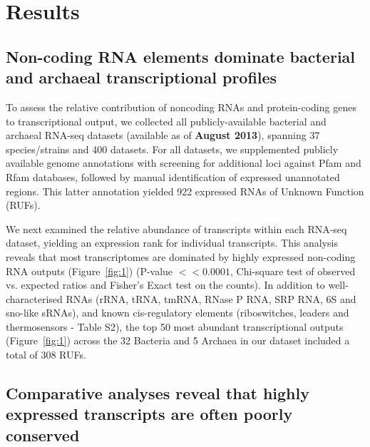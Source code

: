 \documentclass[10pt]{article}
\begin{document}
\section*{Results}

\subsection*{Non-coding RNA elements dominate bacterial and archaeal transcriptional profiles}

To assess the relative contribution of noncoding RNAs and
protein-coding genes to transcriptional output, we collected all
publicly-available bacterial and archaeal RNA-seq datasets (available
as of {\bf August 2013}), spanning 37 species/strains and 400
datasets. For all datasets, we supplemented publicly available genome
annotations with screening for additional loci against Pfam and Rfam
databases, followed by manual identification of expressed unannotated
regions. This latter annotation yielded 922 expressed RNAs of
Unknown Function (RUFs).

We next examined the relative abundance of transcripts within each
RNA-seq dataset, yielding an expression rank for individual
transcripts. This analysis reveals that most transcriptomes are
dominated by highly expressed non-coding RNA outputs
(Figure~\ref{fig:1}) (P-value $<< 0.0001$, Chi-square test of observed
vs. expected ratios and Fisher’s Exact test on the counts). In
addition to well-characterised RNAs (rRNA, tRNA, tmRNA, RNase P RNA,
SRP RNA, 6S and sno-like sRNAs), and known cis-regulatory elements
(riboswitches, leaders and thermosensors - Table S2), the top 50
most abundant transcriptional outputs (Figure~\ref{fig:1}) across the
32 Bacteria and 5 Archaea in our dataset included a total of 308 RUFs.

\subsection*{Comparative analyses reveal that highly expressed transcripts are often poorly conserved}
\end{document}
